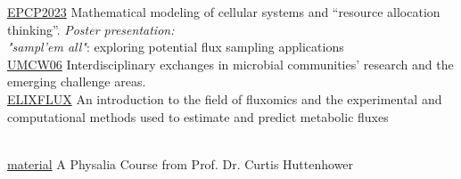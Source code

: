 \documentclass[
    a4paper,
]{fortysecondscv}
\begin{document}
\begin{cvtable}


        {\href{https://appliedhologenomicsconference.eu}{EPCP2023}}
        {Mathematical modeling of cellular systems and “resource allocation thinking”. 
        \textit{Poster presentation: \\ "sampl'em all"}: exploring potential flux sampling applications}{}
    \\
        {\href{https://www.newton.ac.uk/event/umcw06/}{UMCW06}}
        {Interdisciplinary exchanges in microbial communities' research and the emerging challenge areas.}{}
    \\

    {\href{https://tess.elixir-europe.org/events/elixir-fluxomics-training-school-2021}{ELIXFLUX}}
    {An introduction to the field of fluxomics and the experimental and computational methods used to estimate and predict metabolic fluxes}{}

    \\

    {\href{https://docs.google.com/spreadsheets/d/1YwJWejTxh7FLfooKCEJ18QCqvkYKAe5jFtwqQ7qU7bI/edit?gid=674784997\#gid=674784997}{material}}
    {A Physalia Course from Prof. Dr. Curtis Huttenhower}{}

        


\end{cvtable}


\newpage
\makeemptysidebar

\end{document}
